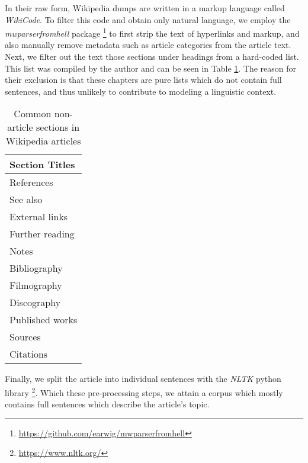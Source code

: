 In their raw form, Wikipedia dumps are written in a markup language called \textit{WikiCode}.
To filter this code and obtain only natural language, we employ the \textit{mwparserfromhell} package \footnote{\url{https://github.com/earwig/mwparserfromhell}} to first strip the text of hyperlinks and markup, and also manually remove metadata such as article categories from the article text.
Next, we filter out the text those sections under headings from a hard-coded list.
This list was compiled by the author and can be seen in Table \ref{tbl:wikipedia-ignored-headings}.
The reason for their exclusion is that these chapters are pure lists which do not contain full sentences, and thus unlikely to contribute to modeling a linguistic context.

\begin{table}[H]
	\centering
	\begin{tabular}{|l|}
		\hline
		\textbf{Section Titles} \\
		\hline
		References              \\
		See also                \\
		External links          \\
		Further reading         \\
		Notes                   \\
		Bibliography            \\
		Filmography             \\
		Discography             \\
		Published works         \\
		Sources                 \\
		Citations               \\
		\hline
	\end{tabular}
	\caption{Common non-article sections in Wikipedia articles}
	\label{tbl:wikipedia-ignored-headings}
\end{table}

Finally, we split the article into individual sentences with the \textit{NLTK} python library \footnote{\url{https://www.nltk.org/}}.
Which these pre-processing steps, we attain a corpus which mostly contains full	sentences which describe the article's topic.


